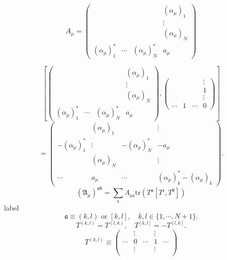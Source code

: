 
\begin{correct}
	\begin{equation*}
		A_\mu =
		\begin{pmatrix}
			& & & (\alpha_\mu)_1 \\
			& & & \vdots \\
			& & & (\alpha_\mu)_N \\
			(\alpha_\mu)_1^* & \cdots & (\alpha_\mu)_N^* & a_\mu
		\end{pmatrix}
	\end{equation*}

	\begin{equation*}
	\left[ 
	\begin{pmatrix}
		& & & (\alpha_\mu)_1 \\
		& & & \vdots \\
		& & & (\alpha_\mu)_N \\
		(\alpha_\mu)_1^* & \cdots & (\alpha_\mu)_N^* & a_\mu
	\end{pmatrix},
	\begin{pmatrix}
		& & & \vdots \\
		& & & 1 \\
		& & & \vdots \\
		\cdots & 1 & \cdots & 0
	\end{pmatrix}
\right] 	
	\end{equation*}
	\[
	 =
	 \begin{pmatrix}
		& (\alpha_\mu)_1 & & \vdots\\
		- (\alpha_\mu)_1^*& \vdots& -(\alpha_\mu)_N^*& -a_\mu\\
		& (\alpha_\mu)_N & & \vdots\\
		 \cdots & a_\mu & \cdots & (\alpha_\mu)_k^* - (\alpha_\mu)_k
	 \end{pmatrix}
	.\] 
	\begin{equation}
		(\mathfrak{A}_\mu)^{\mathfrak{a}\mathfrak{b}}
		= \sum_{\mathfrak{c}} A_{\mu \mathfrak{c}}
		\mathrm{tr}(T^{\mathfrak{a}}[T^{\mathfrak{c}},T^{\mathfrak{b}}])
	\end{equation}
	label
	\[
		\mathfrak{a} \equiv (k,l)\text{ or } [k,l],\quad k,l\in \{1,\cdots,N+1\}
	.\] 
	\[
	T^{(k,l)} = T^{(l,k)},\quad T^{[k,l]} = -T^{[l,k]}
	.\] 
	\[
		T^{(k,l)}\equiv
		\begin{pmatrix}
			 & \vdots& & \vdots& \\
			 \cdots& 0 & \cdots & 1 & \cdots\\
			 & \vdots& & \vdots& \\

\end{pmatrix}\]
\end{correct}
